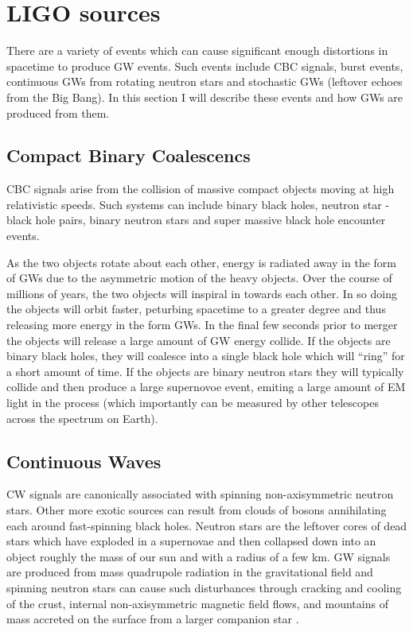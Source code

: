 \section{LIGO sources}

There are a variety of events which can cause significant 
enough distortions in spacetime to produce 
\ac{GW} events. Such events include \ac{CBC} signals, burst events,
continuous \ac{GW}s from rotating neutron stars and 
stochastic \ac{GW}s (leftover echoes from the Big Bang). In this 
section I will describe these events and how \ac{GW}s are 
produced from them.

\subsection{Compact Binary Coalescencs}

\ac{CBC} signals arise from the collision of massive compact 
objects moving at high relativistic speeds. Such systems can 
include binary black holes, neutron star - black hole pairs, binary 
neutron stars and super massive black hole encounter events. 

As the two objects rotate about each other, energy is radiated away in the 
form of \ac{GW}s due to the asymmetric motion of the heavy objects. 
Over the course of millions of years, the two objects will 
inspiral in towards each other. In so doing the objects will 
orbit faster, peturbing spacetime to a greater degree and 
thus releasing more energy in the form \ac{GW}s. In the final few 
seconds prior to merger the objects will release a large amount of 
\ac{GW} energy collide. If the objects are binary black holes, they 
will coalesce into a single black hole which will ``ring'' for a 
short amount of time. If the objects are binary neutron stars they will 
typically collide and then produce a large supernovoe event, emiting 
a large amount of \ac{EM} light in the process (which importantly 
can be measured by other telescopes across the spectrum on Earth). 

\subsection{Continuous Waves}

\ac{CW} signals are canonically associated with spinning non-axisymmetric 
neutron stars. Other more exotic sources can result from clouds of bosons 
annihilating each around fast-spinning black holes. 
Neutron stars are the leftover cores of dead stars 
which have exploded in a supernovae and then collapsed down 
into an object roughly the mass of our sun and with a radius of a 
few km. \ac{GW} signals are produced from mass quadrupole radiation in the 
gravitational field and spinning neutron stars can cause such 
disturbances through cracking and cooling of the crust, internal non-axisymmetric 
magnetic field flows, and mountains of mass accreted on the 
surface from a larger companion star \cite{1712.05897}.

